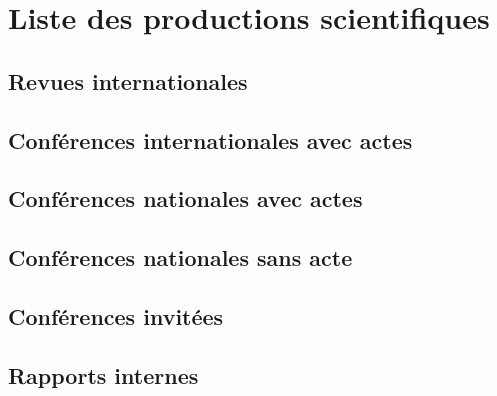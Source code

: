 \chapter{Liste des productions scientifiques}


\section*{Revues internationales}



\section*{Conférences internationales avec actes}


\section*{Conférences nationales avec actes}

\section*{Conférences nationales sans acte}


\section*{Conférences invitées}
\section*{Rapports internes}

